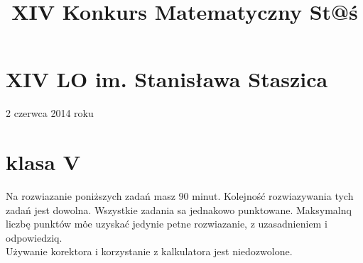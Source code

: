 \documentclass[10pt]{article}
\title{XIV Konkurs Matematyczny St@ś }
\author{}
\date{}
\begin{document}
\maketitle
\section*{XIV LO im. Stanisława Staszica}
2 czerwca 2014 roku

\section*{klasa V}
Na rozwiazanie poniższych zadań masz 90 minut. Kolejność rozwiazywania tych zadań jest dowolna. Wszystkie zadania sa jednakowo punktowane. Maksymalnq liczbę punktów mȯ̇e uzyskać jedynie petne rozwiazanie, z uzasadnieniem i odpowiedziq.\\
Używanie korektora i korzystanie z kalkulatora jest niedozwolone.
\end{document}
